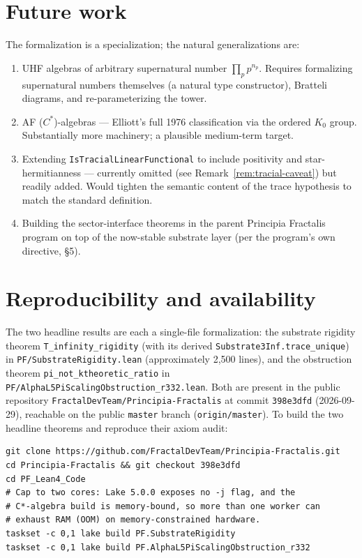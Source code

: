 \documentclass[11pt,a4paper]{article}
\theoremstyle{plain}
\theoremstyle{definition}
\begin{document}
\section{Future work}
\label{sec:future}

The formalization is a specialization; the natural generalizations are:
\begin{enumerate}[leftmargin=*]
  \item UHF algebras of arbitrary supernatural number $\prod_p p^{n_p}$. Requires formalizing supernatural numbers themselves (a natural type constructor), Bratteli diagrams, and re-parameterizing the tower.
  \item AF ($C^{\ast}$)-algebras --- Elliott's full 1976 classification via the ordered $K_0$ group. Substantially more machinery; a plausible medium-term target.
  \item Extending \texttt{IsTracialLinearFunctional} to include positivity and star-hermitianness --- currently omitted (see Remark~\ref{rem:tracial-caveat}) but readily added. Would tighten the semantic content of the trace hypothesis to match the standard definition.
  \item Building the sector-interface theorems in the parent Principia Fractalis program on top of the now-stable substrate layer (per the program's own directive, \S 5).
\end{enumerate}

\section{Reproducibility and availability}
\label{sec:availability}

The two headline results are each a single-file formalization: the substrate rigidity theorem \texttt{T\_infinity\_rigidity} (with its derived \texttt{Substrate3Inf.trace\_unique}) in \texttt{PF/SubstrateRigidity.lean} (approximately 2{,}500 lines), and the obstruction theorem \texttt{pi\_not\_ktheoretic\_ratio} in \texttt{PF/AlphaL5PiScalingObstruction\_r332.lean}. Both are present in the public repository \texttt{FractalDevTeam/Principia-Fractalis} at commit \texttt{398e3dfd} (2026-09-29), reachable on the public \texttt{master} branch (\texttt{origin/master}). To build the two headline theorems and reproduce their axiom audit:

\begin{lstlisting}[language={}]
git clone https://github.com/FractalDevTeam/Principia-Fractalis.git
cd Principia-Fractalis && git checkout 398e3dfd
cd PF_Lean4_Code
# Cap to two cores: Lake 5.0.0 exposes no -j flag, and the
# C*-algebra build is memory-bound, so more than one worker can
# exhaust RAM (OOM) on memory-constrained hardware.
taskset -c 0,1 lake build PF.SubstrateRigidity
taskset -c 0,1 lake build PF.AlphaL5PiScalingObstruction_r332
\end{lstlisting}
\end{document}
